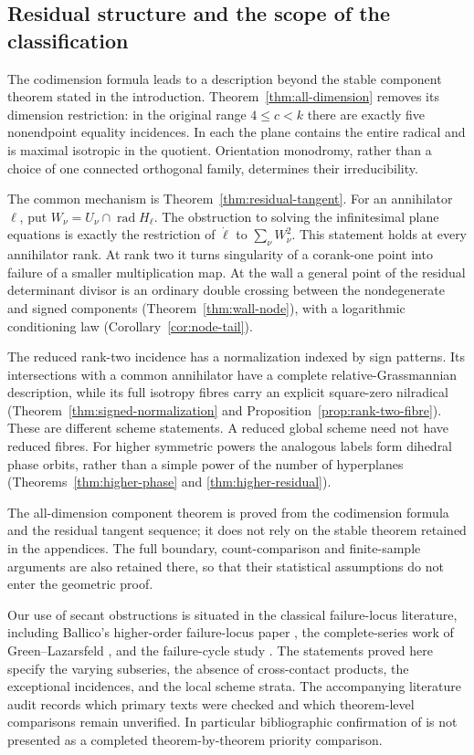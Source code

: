 \subsection*{Residual structure and the scope of the classification}
The codimension formula leads to a description beyond the stable
component theorem stated in the introduction. Theorem~\ref{thm:all-dimension}
removes its dimension restriction: in the original range $4\le c<k$
there are exactly five nonendpoint equality incidences. In each the
plane contains the entire radical and is maximal isotropic in the
quotient. Orientation monodromy, rather than a choice of one connected
orthogonal family, determines their irreducibility.

The common mechanism is Theorem~\ref{thm:residual-tangent}. For an
annihilator $\ell$, put $W_\nu=U_\nu\cap\operatorname{rad}H_\ell$.
The obstruction to solving the infinitesimal plane equations is exactly
the restriction of $\dot\ell$ to $\sum_\nu W_\nu^2$.
This statement holds at every annihilator rank. At rank two it turns
singularity of a corank-one point into failure of a smaller multiplication
map. At the wall a general point of the residual determinant divisor
is an ordinary double crossing between the nondegenerate and signed
components (Theorem~\ref{thm:wall-node}), with a logarithmic conditioning
law (Corollary~\ref{cor:node-tail}).

The reduced rank-two incidence has a normalization indexed by sign
patterns. Its intersections with a common annihilator have a complete
relative-Grassmannian description, while its full isotropy fibres carry
an explicit square-zero nilradical
(Theorem~\ref{thm:signed-normalization} and
Proposition~\ref{prop:rank-two-fibre}). These are different scheme
statements. A reduced global scheme need not have reduced fibres.
For higher symmetric powers the analogous labels form dihedral phase
orbits, rather than a simple power of the number of hyperplanes
(Theorems~\ref{thm:higher-phase} and \ref{thm:higher-residual}).

The all-dimension component theorem is proved from the codimension
formula and the residual tangent sequence; it does not rely on the
stable theorem retained in the appendices. The full boundary,
count-comparison and finite-sample arguments are also retained there,
so that their statistical assumptions do not enter the geometric proof.

Our use of secant obstructions is situated in the classical failure-locus
literature, including Ballico's higher-order failure-locus paper
\cite{Ballico93}, the complete-series work of Green--Lazarsfeld
\cite{GL86}, and the failure-cycle study \cite{Ballico96}.
The statements proved here specify the varying subseries, the absence
of cross-contact products, the exceptional incidences, and the local
scheme strata. The accompanying literature audit records which primary
texts were checked and which theorem-level comparisons remain
unverified. In particular bibliographic confirmation of \cite{Ballico93}
is not presented as a completed theorem-by-theorem priority comparison.

